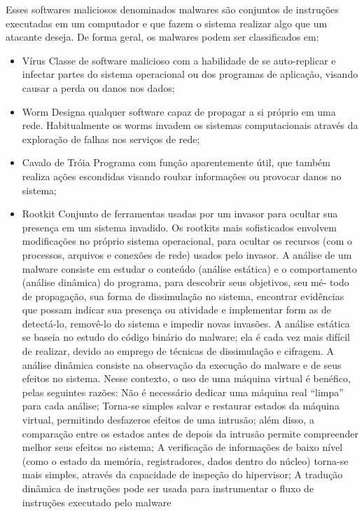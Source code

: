 Esses softwares maliciosos  denominados malwares são conjuntos de instruções executadas em um computador e que fazem o sistema realizar algo que um atacante deseja. De forma geral, os malwares podem ser classificados em:
\begin{itemize}
\item Vírus
Classe de software malicioso com a habilidade de se auto-replicar e infectar partes do sistema operacional ou dos programas de aplicação, visando causar a perda ou danos nos dados;
\item Worm
Designa qualquer software capaz de propagar a si próprio em
uma rede. Habitualmente os worms invadem os sistemas computacionais através da exploração de falhas nos serviços de rede;
\item  Cavalo de Tróia
Programa com função aparentemente útil, que também realiza ações escondidas visando roubar informações ou provocar danos no sistema;
\item Rootkit
Conjunto de ferramentas usadas por um invasor para ocultar sua presença em um sistema invadido. Os rootkits mais sofisticados envolvem modificações no próprio sistema operacional, para ocultar os recursos (com o processos, arquivos e conexões de rede) usados pelo invasor. A análise de um  malware consiste em estudar o conteúdo (análise estática) e o comportamento (análise dinâmica) do programa, para descobrir seus objetivos, seu mé-
todo de propagação, sua forma de dissimulação no sistema, encontrar evidências que possam indicar sua presença ou atividade e implementar form
as de detectá-lo, removê-lo do sistema e impedir novas invasões. A análise estática se baseia no estudo do código binário do malware; ela é cada vez mais difícil de realizar, devido ao emprego de técnicas de dissimulação e cifragem. A análise dinâmica consiste na observação da execução do
malware e de seus efeitos no sistema. Nesse contexto, o uso de uma máquina virtual é benéfico, pelas seguintes razões: Não é necessário dedicar uma máquina real “limpa” para cada análise; Torna-se simples salvar e restaurar estados da máquina virtual, permitindo desfazeros efeitos de uma intrusão; além disso, a comparação entre os estados antes de depois da intrusão permite compreender melhor seus efeitos no sistema; A verificação de informações de baixo nível (como o estado da memória, registradores, dados dentro do núcleo) torna-se mais simples, através da capacidade de inspeção do hipervisor; A tradução dinâmica de instruções pode ser usada para instrumentar o fluxo de instruções executado pelo malware
\end{itemize}

